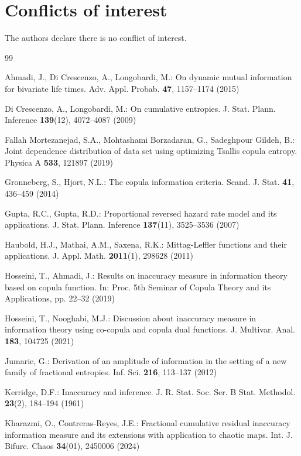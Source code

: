 \documentclass[12pt, a4paper]{article}
\numberwithin{equation}{section}
\begin{document}
\section*{Conflicts of interest} The authors declare there is no conflict of interest.
\begin{thebibliography}{99}
	
	 Ahmadi, J., Di Crescenzo, A., Longobardi, M.: On dynamic mutual information for bivariate life times. Adv. Appl. Probab. \textbf{47}, 1157–1174 (2015)
	
	 Di Crescenzo, A., Longobardi, M.: On cumulative entropies. J. Stat. Plann. Inference \textbf{139}(12), 4072–4087 (2009)
	
	 Fallah Mortezanejad, S.A., Mohtashami Borzadaran, G., Sadeghpour Gildeh, B.: Joint dependence distribution of data set using optimizing Tsallis copula entropy. Physica A \textbf{533}, 121897 (2019)
	
	 Gronneberg, S., Hjort, N.L.: The copula information criteria. Scand. J. Stat. \textbf{41}, 436–459 (2014)
	
	 Gupta, R.C., Gupta, R.D.: Proportional reversed hazard rate model and its applications. J. Stat. Plann. Inference \textbf{137}(11), 3525–3536 (2007)
	
	 Haubold, H.J., Mathai, A.M., Saxena, R.K.: Mittag-Leffler functions and their applications. J. Appl. Math. \textbf{2011}(1), 298628 (2011)
	
	 Hosseini, T., Ahmadi, J.: Results on inaccuracy measure in information theory based on copula function. In: Proc. 5th Seminar of Copula Theory and its Applications, pp. 22–32 (2019)
	
	 Hosseini, T., Nooghabi, M.J.: Discussion about inaccuracy measure in information theory using co-copula and copula dual functions. J. Multivar. Anal. \textbf{183}, 104725 (2021)
	
	 Jumarie, G.: Derivation of an amplitude of information in the setting of a new family of fractional entropies. Inf. Sci. \textbf{216}, 113–137 (2012)
	
	 Kerridge, D.F.: Inaccuracy and inference. J. R. Stat. Soc. Ser. B Stat. Methodol. \textbf{23}(2), 184–194 (1961)
	
	 Kharazmi, O., Contreras-Reyes, J.E.: Fractional cumulative residual inaccuracy information measure and its extensions with application to chaotic maps. Int. J. Bifurc. Chaos \textbf{34}(01), 2450006 (2024)
	

\end{thebibliography}
\end{document}
